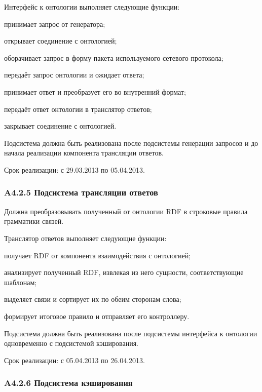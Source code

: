 Интерфейс к онтологии выполняет следующие функции:
\begin{list}{}{\leftmargin=1.5cm}
  \item принимает запрос от генератора;
  \item открывает соединение с онтологией;
  \item оборачивает запрос в форму пакета используемого сетевого протокола;
  \item передаёт запрос онтологии и ожидает ответа;
  \item принимает ответ и преобразует его во внутренний формат;
  \item передаёт ответ онтологии в транслятор ответов;
  \item закрывает соединение с онтологией.
\end{list}

Подсистема должна быть реализована после подсистемы генерации запросов и до начала реализации компонента трансляции ответов.

Срок реализации: с 29.03.2013 по 05.04.2013.

\subsubsection*{A4.2.5 Подсистема трансляции ответов}

Должна преобразовывать полученный от онтологии RDF в строковые правила грамматики связей.

Транслятор ответов выполняет следующие функции:
\begin{list}{}{\leftmargin=1.5cm}
  \item получает RDF от компонента взаимодействия с онтологией;
  \item анализирует полученный RDF, извлекая из него сущности, соответствующие шаблонам;
  \item выделяет связи и сортирует их по обеим сторонам слова;
  \item формирует итоговое правило и отправляет его контроллеру.
\end{list}

Подсистема должна быть реализована после подсистемы интерфейса к онтологии одновременно с подсистемой кэширования.

Срок реализации: с 05.04.2013 по 26.04.2013.

\subsubsection*{A4.2.6 Подсистема кэширования}

